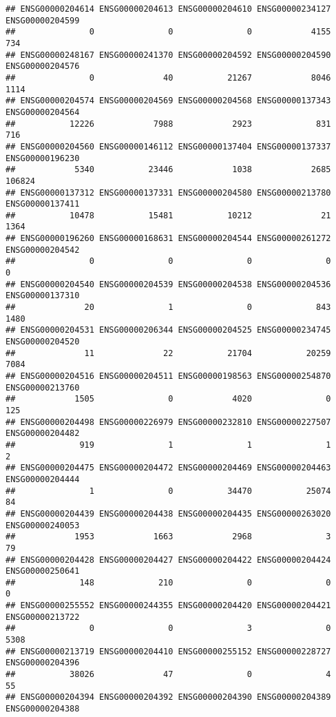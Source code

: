 \documentclass[
]{article}
\begin{document}
\begin{verbatim}
## ENSG00000204614 ENSG00000204613 ENSG00000204610 ENSG00000234127 ENSG00000204599 
##               0               0               0            4155             734 
## ENSG00000248167 ENSG00000241370 ENSG00000204592 ENSG00000204590 ENSG00000204576 
##               0              40           21267            8046            1114 
## ENSG00000204574 ENSG00000204569 ENSG00000204568 ENSG00000137343 ENSG00000204564 
##           12226            7988            2923             831             716 
## ENSG00000204560 ENSG00000146112 ENSG00000137404 ENSG00000137337 ENSG00000196230 
##            5340           23446            1038            2685          106824 
## ENSG00000137312 ENSG00000137331 ENSG00000204580 ENSG00000213780 ENSG00000137411 
##           10478           15481           10212              21            1364 
## ENSG00000196260 ENSG00000168631 ENSG00000204544 ENSG00000261272 ENSG00000204542 
##               0               0               0               0               0 
## ENSG00000204540 ENSG00000204539 ENSG00000204538 ENSG00000204536 ENSG00000137310 
##              20               1               0             843            1480 
## ENSG00000204531 ENSG00000206344 ENSG00000204525 ENSG00000234745 ENSG00000204520 
##              11              22           21704           20259            7084 
## ENSG00000204516 ENSG00000204511 ENSG00000198563 ENSG00000254870 ENSG00000213760 
##            1505               0            4020               0             125 
## ENSG00000204498 ENSG00000226979 ENSG00000232810 ENSG00000227507 ENSG00000204482 
##             919               1               1               1               2 
## ENSG00000204475 ENSG00000204472 ENSG00000204469 ENSG00000204463 ENSG00000204444 
##               1               0           34470           25074              84 
## ENSG00000204439 ENSG00000204438 ENSG00000204435 ENSG00000263020 ENSG00000240053 
##            1953            1663            2968               3              79 
## ENSG00000204428 ENSG00000204427 ENSG00000204422 ENSG00000204424 ENSG00000250641 
##             148             210               0               0               0 
## ENSG00000255552 ENSG00000244355 ENSG00000204420 ENSG00000204421 ENSG00000213722 
##               0               0               3               0            5308 
## ENSG00000213719 ENSG00000204410 ENSG00000255152 ENSG00000228727 ENSG00000204396 
##           38026              47               0               4              55 
## ENSG00000204394 ENSG00000204392 ENSG00000204390 ENSG00000204389 ENSG00000204388 

\end{verbatim}
\end{document}
